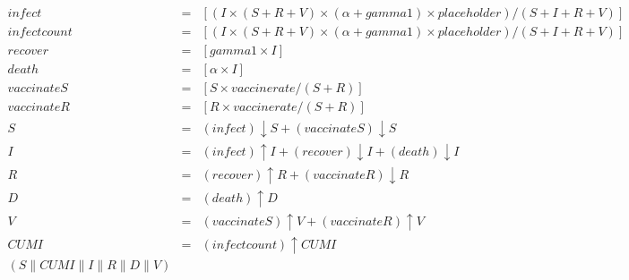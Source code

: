 \begin{eqnarray*}
\mathit{infect} & = & [(I\times (S+R+V)\times (\alpha+\mathit{gamma1})\times \mathit{placeholder})/(S+I+R+V)]\\%
\mathit{infectcount} & = & [(I\times (S+R+V)\times (\alpha+\mathit{gamma1})\times \mathit{placeholder})/(S+I+R+V)]\\%
\mathit{recover} & = & [\mathit{gamma1}\times I]\\%
\mathit{death} & = & [\alpha\times I]\\%
\mathit{vaccinateS} & = & [S\times \mathit{vaccinerate}/(S+R)]\\%
\mathit{vaccinateR} & = & [R\times \mathit{vaccinerate}/(S+R)]\\%
%
S & = & (\mathit{infect}){\downarrow}S + (\mathit{vaccinateS}){\downarrow}S\\%
I & = & (\mathit{infect}){\uparrow}I + (\mathit{recover}){\downarrow}I + (\mathit{death}){\downarrow}I\\%
R & = & (\mathit{recover}){\uparrow}R + (\mathit{vaccinateR}){\downarrow}R\\%
D & = & (\mathit{death}){\uparrow}D\\%
V & = & (\mathit{vaccinateS}){\uparrow}V + (\mathit{vaccinateR}){\uparrow}V\\%
%
\mathit{CUMI} & = & (\mathit{infectcount}){\uparrow}\mathit{CUMI}\\%
%
(S {\parallel} \mathit{CUMI} {\parallel} I {\parallel} R {\parallel} D {\parallel} V)\end{eqnarray*}
